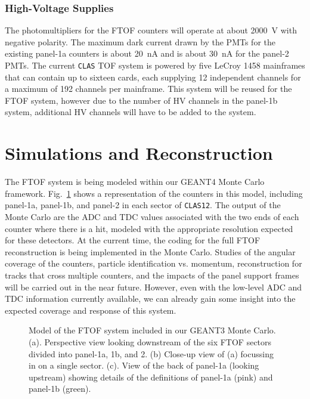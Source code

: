 \subsubsection{High-Voltage Supplies}

The photomultipliers for the FTOF counters will operate at about 2000~V with
negative polarity.  The maximum dark current drawn by the PMTs for the
existing panel-1a counters is about 20~nA and is about 30~nA for the
panel-2 PMTs.  The current {\tt CLAS} TOF system is powered by five 
LeCroy 1458 mainframes that can contain up to sixteen cards, each supplying 
12 independent channels for a maximum of 192 channels per mainframe.  This
system will be reused for the FTOF system, however due to the number of HV
channels in the panel-1b system, additional HV channels will have to
be added to the system.

\section{Simulations and Reconstruction}

The FTOF system is being modeled within our GEANT4 Monte Carlo framework.  
Fig.~\ref{gsim_ftof} shows a representation of the counters in this model,
including panel-1a, panel-1b, and panel-2 in each sector of {\tt CLAS12}.
The output of the Monte Carlo are the ADC and TDC values associated with
the two ends of each counter where there is a hit, modeled with the
appropriate resolution expected for these detectors.  At the current time, 
the coding for the full FTOF reconstruction is being implemented in the 
Monte Carlo.  Studies of the angular coverage of the counters, particle 
identification vs. momentum, reconstruction for tracks that cross multiple 
counters, and the impacts of the panel support frames will be carried out
in the near future.  However, even with the low-level ADC and TDC information
currently available, we can already gain some insight into the expected 
coverage and response of this system.

\begin{figure}[htbp]
\vspace{15.0cm}
\caption{\small{Model of the FTOF system included in our GEANT3 Monte 
Carlo. (a). Perspective view looking downstream of the six FTOF sectors 
divided into panel-1a, 1b, and 2. (b) Close-up view of (a) focussing in 
on a single sector. (c). View of the back of panel-1a (looking upstream) 
showing details of the definitions of panel-1a (pink) and panel-1b (green).}}
\label{gsim_ftof}
\end{figure}

